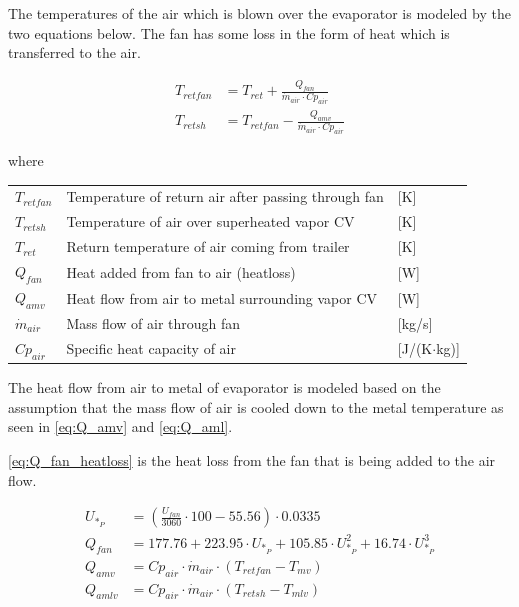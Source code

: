 \medskip
The temperatures of the air which is blown over the evaporator is modeled by the two equations below. The fan has some loss in the form of heat which is transferred to the air.

\begin{align}
	T_{retfan} 		& = T_{ret} + \frac{Q_{fan}}{\dot{m}_{air} \cdot Cp_{air}} 		\label{eq:T_retfan} 		\\
	T_{retsh} 		& = T_{retfan} - \frac{Q_{amv}}{\dot{m}_{air} \cdot Cp_{air}} 	\label{eq:T_retsh}
\end{align}

where

\begin{center}
	\begin{tabular}{l p{10cm} l}
		$T_{retfan}$    & Temperature of return air after passing through fan & [\si{K}]                          \\
		$T_{retsh}$     & Temperature of air over superheated vapor CV        & [\si{K}]                          \\
		$T_{ret}$       & Return temperature of air coming from trailer       & [\si{K}]                          \\
		$Q_{fan}$       & Heat added from fan to air (heatloss)               & [\si{W}]                          \\
		$Q_{amv}$       & Heat flow from air to metal surrounding vapor CV    & [\si{W}]                          \\
		$\dot{m}_{air}$ & Mass flow of air through fan                        & [\si{kg}/\si{s}]                  \\
		$Cp_{air}$      & Specific heat capacity of air                       & [\si{J}/(\si{K}$ \cdot $\si{kg})]
	\end{tabular}
\end{center}

\medskip
The heat flow from air to metal of evaporator is modeled based on the assumption that the mass flow of air is cooled down to the metal temperature as seen in \cref{eq:Q_amv} and \cref{eq:Q_aml}.

\cref{eq:Q_fan_heatloss} is the heat loss from the fan that is being added to the air flow.

\begin{align}
	U_{*_P} & = \left( \frac{U_{fan}}{3060}\cdot 100 - 55.56 \right) \cdot 0.0335                                         \\
	Q_{fan} & = 177.76 + 223.95 \cdot U_{*_P} + 105.85 \cdot U_{*_P}^2 + 16.74 \cdot U_{*_P}^3	\label{eq:Q_fan_heatloss} \\
	Q_{amv} & = Cp_{air} \cdot \dot{m}_{air} \cdot (T_{retfan} - T_{mv}) 	\label{eq:Q_amv}                                \\
	Q_{amlv} & = Cp_{air} \cdot \dot{m}_{air} \cdot (T_{retsh} - T_{mlv}) 	\label{eq:Q_aml}
\end{align}

